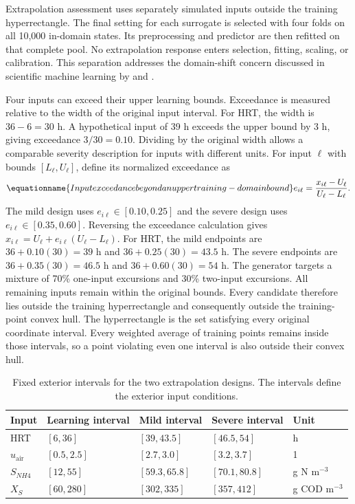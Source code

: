 Extrapolation assessment uses separately simulated inputs outside the training hyperrectangle. The final setting for each surrogate is selected with four folds on all 10,000 in-domain states. Its preprocessing and predictor are then refitted on that complete pool. No extrapolation response enters selection, fitting, scaling, or calibration. This separation addresses the domain-shift concern discussed in scientific machine learning by \citet{Karniadakis2021} and \citet{Shen2023}.

Four inputs can exceed their upper learning bounds. Exceedance is measured relative to the width of the original input interval. For HRT, the width is $36-6=30$ h. A hypothetical input of 39 h exceeds the upper bound by 3 h, giving exceedance $3/30=0.10$. Dividing by the original width allows a comparable severity description for inputs with different units. For input $\ell$ with bounds $[L_\ell,U_\ell]$, define its normalized exceedance as
\begin{equation}
\equationname{Input exceedance beyond an upper training-domain bound}
e_{i\ell}=\frac{x_{i\ell}-U_\ell}{U_\ell-L_\ell}.
\label{eq:projection_domain_exceedance}
\end{equation}
The mild design uses $e_{i\ell}\in[0.10,0.25]$ and the severe design uses $e_{i\ell}\in[0.35,0.60]$. Reversing the exceedance calculation gives $x_{i\ell}=U_\ell+e_{i\ell}(U_\ell-L_\ell)$. For HRT, the mild endpoints are $36+0.10(30)=39$ h and $36+0.25(30)=43.5$ h. The severe endpoints are $36+0.35(30)=46.5$ h and $36+0.60(30)=54$ h. The generator targets a mixture of 70\% one-input excursions and 30\% two-input excursions. All remaining inputs remain within the original bounds. Every candidate therefore lies outside the training hyperrectangle and consequently outside the training-point convex hull. The hyperrectangle is the set satisfying every original coordinate interval. Every weighted average of training points remains inside those intervals, so a point violating even one interval is also outside their convex hull.

\begin{table}[htbp]
\centering
\caption{Fixed exterior intervals for the two extrapolation designs. The intervals define the exterior input conditions.}
\label{tab:reactor_extrapolation_domain}
\small
\begin{tabular}{lllll}
\toprule
Input & Learning interval & Mild interval & Severe interval & Unit\\
\midrule
HRT & $[6,36]$ & $[39,43.5]$ & $[46.5,54]$ & h\\
$u_{\mathrm{air}}$ & $[0.5,2.5]$ & $[2.7,3.0]$ & $[3.2,3.7]$ & 1\\
$S_{NH4}$ & $[12,55]$ & $[59.3,65.8]$ & $[70.1,80.8]$ & g N m$^{-3}$\\
$X_S$ & $[60,280]$ & $[302,335]$ & $[357,412]$ & g COD m$^{-3}$\\
\bottomrule
\end{tabular}
\end{table}

